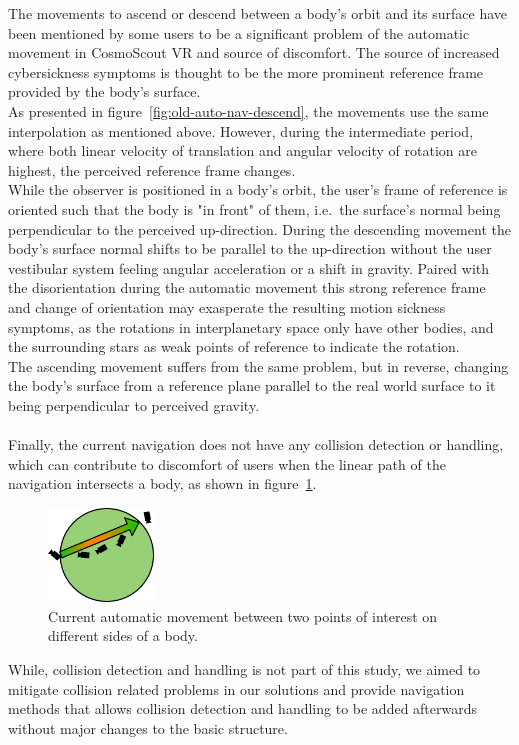 The movements to ascend or descend between a body's orbit and its surface have been mentioned by some users to be a
significant problem of the automatic movement in CosmoScout VR and source of discomfort.
The source of increased cybersickness symptoms is thought to be the more prominent reference frame provided by the
body's surface.
\\
As presented in figure~\ref{fig:old-auto-nav-descend}, the movements use the same interpolation as mentioned above.
However, during the intermediate period, where both linear velocity of translation and angular velocity of rotation
are highest, the perceived reference frame changes.
\\
While the observer is positioned in a body's orbit, the user's frame of reference is oriented such that the body is
"in front" of them, i.e.\ the surface's normal being perpendicular to the perceived up-direction.
During the descending movement the body's surface normal shifts to be parallel to the up-direction without the user
vestibular system feeling angular acceleration or a shift in gravity.
Paired with the disorientation during the automatic movement this strong reference frame and change of orientation may
exasperate the resulting motion sickness symptoms, as the rotations in interplanetary space only have other bodies,
and the surrounding stars as weak points of reference to indicate the rotation.
\\
The ascending movement suffers from the same problem, but in reverse, changing the body's surface from a reference
plane parallel to the real world surface to it being perpendicular to perceived gravity.
\\
\\
Finally, the current navigation does not have any collision detection or handling, which can contribute to discomfort
of users when the linear path of the navigation intersects a body, as shown in figure~\ref{fig:old-auto-nav-collision}.
\begin{figure}[h]
    \centering
    \includegraphics[width=0.25\textwidth]{content/3_current_state/img/OldAutomaticNavigation_SurfaceCollision}
    \caption{Current automatic movement between two points of interest on different sides of a body.}
    \label{fig:old-auto-nav-collision}
\end{figure}
While, collision detection and handling is not part of this study, we aimed to mitigate collision related problems in
our solutions and provide navigation methods that allows collision detection and handling to be added afterwards
without major changes to the basic structure.
